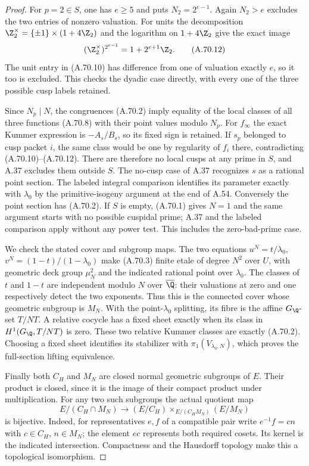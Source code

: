 \begin{proof}
For $p=2\in S$, one has $e\ge5$ and puts
$N_2=2^{e-1}$.
Again $N_2>e$ excludes the two entries of nonzero
valuation.  For units the decomposition
$\Z_2^\times=\{\pm1\}\times(1+4\Z_2)$ and
the logarithm on $1+4\Z_2$ give the exact image
\[
                  (\Z_2^\times)^{2^{e-1}}
                              =1+2^{e+1}\Z_2.
\tag{A.70.12}
\]
The unit entry in (A.70.10) has difference from one
of valuation exactly $e$, so it too is excluded.
This checks the dyadic case directly, with every
one of the three possible cusp labels retained.

Since $N_p\mid N$, the congruences (A.70.2)
imply equality of the local classes of all three
functions (A.70.8) with their point values modulo
$N_p$.  For $f_\infty$ the exact Kummer expression
is $-A_s/B_s$, so its fixed sign is retained.
If $s_p$ belonged to cusp packet $i$, the same
class would be one by regularity of $f_i$ there,
contradicting (A.70.10)--(A.70.12).
There are therefore no local cusps at any prime
in $S$, and A.37 excludes them outside $S$.
The no-cusp case of A.37 recognizes $s$ as a
rational point section.  The labeled integral
comparison identifies its parameter exactly with
$\lambda_0$ by the primitive-isogeny argument
at the end of A.54.
Conversely the point section has (A.70.2).
If $S$ is empty, (A.70.1) gives $N=1$ and the
same argument starts with no possible cuspidal
prime; A.37 and the labeled comparison apply
without any power test.  This includes the
zero-bad-prime case.

We check the stated cover and subgroup maps.
The two equations
$u^N=t/\lambda_0$, $v^N=(1-t)/(1-\lambda_0)$
make (A.70.3) finite etale of degree $N^2$ over
$U$, with geometric deck group $\mu_N^2$ and
the indicated rational point over $\lambda_0$.
The classes of $t$ and $1-t$ are independent
modulo $N$ over $\overline\Q$: their valuations
at zero and one respectively detect the two
exponents.  Thus this is the connected cover
whose geometric subgroup is $M_N$.
With the point-$\lambda_0$ splitting, its fibre
is the affine $G_\Q$-set $T/NT$.
A relative cocycle has a fixed sheet exactly
when its class in $H^1(G_\Q,T/NT)$ is zero.
These two relative Kummer classes are exactly
(A.70.2).  Choosing a fixed sheet identifies its
stabilizer with $\pi_1(V_{\lambda_0,N})$, which
proves the full-section lifting equivalence.

Finally both $C_H$ and $M_N$ are closed normal
geometric subgroups of $E$.  Their product is
closed, since it is the image of their compact
product under multiplication.
For any two such subgroups the actual quotient map
\[
 E/(C_H\cap M_N)\longrightarrow
          (E/C_H)\mathbin{\times}_{E/(C_HM_N)}(E/M_N)
\tag{A.70.13}
\]
is bijective.  Indeed, for representatives $e,f$
of a compatible pair write $e^{-1}f=cn$ with
$c\in C_H$, $n\in M_N$; the element $ec$
represents both required cosets.  Its kernel is
the indicated intersection.  Compactness and the
Hausdorff topology make this a topological
isomorphism.


\end{proof}

